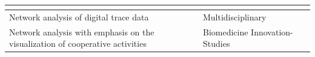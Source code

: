 \documentclass[CHICAGO,Times1COL]{WileyNJDv5} %
\begin{document}
{\begin{table}[h]
\begin{threeparttable}
\begin{tabular}{|l|m{3.1cm}|m{4.3cm}|}
 { %
  \citet{Teixeira2023}   \newline
 \citet{GrisoldKremser_et_al2024} %
 } \\

\hline
  {Network analysis of digital trace data} & 
  {\centering   Multidisciplinary} & 
 
 { %
 \citet{hahn_emergence_2008}   \newline
 \citet{howison2012validity} %
 } \\
 \hline
  {Network  analysis with emphasis on the visualization of cooperative activities } &
 {\centering Biomedicine  \newline Innovation-Studies }
 & 
 

\end{tabular}
\end{threeparttable}
\end{table}}
\end{document}

